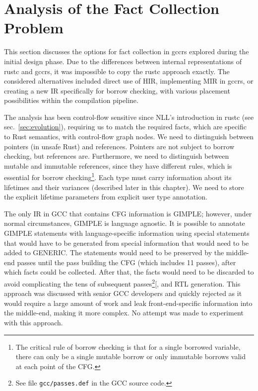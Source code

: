 \documentclass[
  11pt,
  twoside]{report}
\begin{document}
\section{Analysis of the Fact Collection
Problem}\label{sec:analysis-of-the-fact-collection-problem}

This section discusses the options for fact collection in gccrs explored
during the initial design phase. Due to the differences between internal
representations of rustc and gccrs, it was impossible to copy the rustc
approach exactly. The considered alternatives included direct use of
HIR, implementing MIR in gccrs, or creating a new IR specifically for
borrow checking, with various placement possibilities within the
compilation pipeline.

The analysis has been control-flow sensitive since NLL's introduction in
rustc (see sec.~\ref{sec:evolution}), requiring us to match the required
facts, which are specific to Rust semantics, with control-flow graph
nodes. We need to distinguish between pointers (in unsafe Rust) and
references. Pointers are not subject to borrow checking, but references
are. Furthermore, we need to distinguish between mutable and immutable
references, since they have different rules, which is essential for
borrow checking\footnote{The critical rule of borrow checking is that
  for a single borrowed variable, there can only be a single mutable
  borrow or only immutable borrows valid at each point of the CFG.}.
Each type must carry information about its lifetimes and their variances
(described later in this chapter). We need to store the explicit
lifetime parameters from explicit user type annotation.

The only IR in GCC that contains CFG information is GIMPLE; however,
under normal circumstances, GIMPLE is language agnostic. It is possible
to annotate GIMPLE statements with language-specific information using
special statements that would have to be generated from special
information that would need to be added to GENERIC. The statements would
need to be preserved by the middle-end passes until the pass building
the CFG (which includes 11 passes), after which facts could be
collected. After that, the facts would need to be discarded to avoid
complicating the tens of subsequent
passes\footnote{See file \texttt{gcc/passes.def} in the GCC source code.}{[}\citeproc{ref-gccint}{12,
p.~141}{]}, and RTL generation. This approach was discussed with senior
GCC developers and quickly rejected as it would require a large amount
of work and leak front-end-specific information into the middle-end,
making it more complex. No attempt was made to experiment with this
approach.
\end{document}
